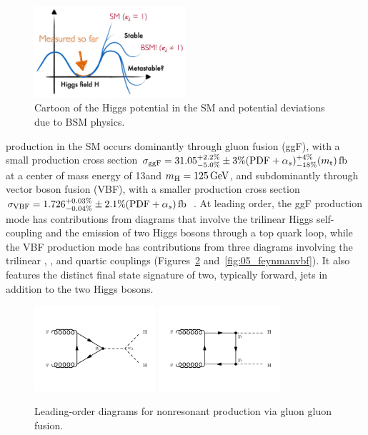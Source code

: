\begin{figure}[ht]
	\centering
	\includegraphics[width=0.5\textwidth]{figures/01-SM-03-SM/higgs/higgs_potential}
	\caption{Cartoon of the Higgs potential in the SM and potential deviations due to BSM physics.}
	\label{fig:01_sm_higgs_potential}
\end{figure}

\HH production in the SM occurs dominantly through gluon fusion (ggF), with a small production cross section $\sigma_\mathrm{ggF} = 31.05^{+2.2\%}_{-5.0\%} \pm 3\% (\textrm{PDF}+\alpha_s)^{+4\%}_{-18\%} (m_\textrm{t})\text{\,fb}$~\cite{Grazzini:2018bsd,Baglio:2020wgt} at a center of mass energy of 13\TeV and $m_{\textrm{H}} = 125\,\text{Ge\hspace{-.08em}V}$, and subdominantly through vector boson fusion (VBF), with a smaller production cross section $\sigma_\mathrm{VBF} = 1.726^{+0.03\%}_{-0.04\%} \pm 2.1\% (\textrm{PDF}+\alpha_s)\text{\,fb}$~\cite{LHCHiggsCrossSectionWorkingGroup:2016ypw}.
At leading order, the ggF production mode has contributions from diagrams that involve the trilinear \HHH Higgs self-coupling and the emission of two Higgs bosons through a top quark loop, while the VBF production mode has contributions from three diagrams involving the trilinear \HHH, \HVV, and quartic \HHVV couplings (Figures~\ref{fig:05_feynmanggf} and~\ref{fig:05_feynmanvbf}).
It also features the distinct final state signature of two, typically forward, jets in addition to the two Higgs bosons.

\begin{figure}[htb] %
    \centering
    \includegraphics[width=0.4\textwidth]{figures/05-HH/production/diagrams/feynman_02.pdf}
    \includegraphics[width=0.4\textwidth]{figures/05-HH/production/diagrams/feynman_01.pdf}
    \caption{Leading-order diagrams for nonresonant \HH production via gluon gluon fusion.}
    \label{fig:05_feynmanggf}
\end{figure}  
    
